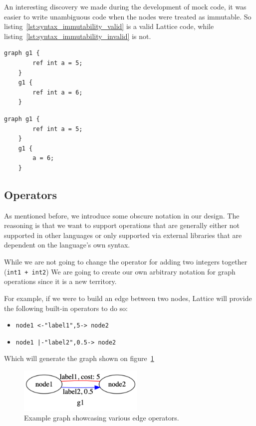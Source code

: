 An interesting discovery we made during the development of mock code, it was easier to write unambiguous code
when the nodes were treated as immutable.
So listing~\ref{lst:syntax_immutability_valid} is a valid Lattice code, while listing~\ref{lst:syntax_immutability_invalid} is not.

\begin{lstlisting}[caption={Valid destruction and recreation of nodes.},captionpos=b,label={lst:syntax_immutability_valid}]
    graph g1 {
        ref int a = 5;
    }
    g1 {
        ref int a = 6;
    }
\end{lstlisting}

\begin{lstlisting}[caption={Code violating the immutability of nodes.},captionpos=b,label={lst:syntax_immutability_invalid}]
    graph g1 {
        ref int a = 5;
    }
    g1 {
        a = 6;
    }
\end{lstlisting}


\subsection{Operators}\label{subsec:syntax_operators}
As mentioned before, we introduce some obscure notation in our design.
The reasoning is that we want to support operations that are generally either not supported in other languages
or only supported via external libraries that are dependent on the language's own syntax.

While we are not going to change the operator for adding two integers together (\lstinline{int1 + int2})
We are going to create our own arbitrary notation for graph operations since it is a new territory.

For example, if we were to build an edge between two nodes,
Lattice will provide the following built-in operators to do so:

\begin{itemize}
    \item \lstinline{node1 <-"label1",5-> node2}
    \item \lstinline{node1 |-"label2",0.5-> node2}
\end{itemize}

Which will generate the graph shown on figure~\ref{fig:relation_basic_operator}
\begin{figure}[H]
    \centering
    \includegraphics[width=6cm]{figures/syntax_section/syntax_rel_basic}
    \caption{Example graph showcasing various edge operators.}
    \label{fig:relation_basic_operator}
\end{figure}


